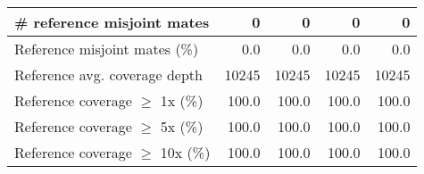 \documentclass[12pt,a4paper]{article}
\begin{document}
\begin{table}[ht]
\begin{center}
\begin{tabular}{|l*{4}{|r}|}
\# reference misjoint mates & 0 & 0 & 0 & 0 \\ \hline
Reference misjoint mates (\%) & 0.0 & 0.0 & 0.0 & 0.0 \\ \hline
Reference avg. coverage depth & 10245 & 10245 & 10245 & 10245 \\ \hline
Reference coverage $\geq$ 1x (\%) & 100.0 & 100.0 & 100.0 & 100.0 \\ \hline
Reference coverage $\geq$ 5x (\%) & 100.0 & 100.0 & 100.0 & 100.0 \\ \hline
Reference coverage $\geq$ 10x (\%) & 100.0 & 100.0 & 100.0 & 100.0 \\ \hline
\end{tabular}
\end{center}
\end{table}
\end{document}
